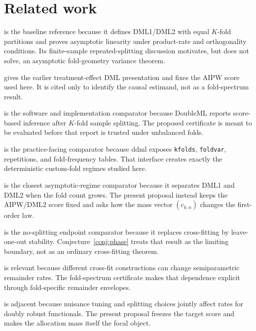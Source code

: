 \documentclass[11pt]{article}
\theoremstyle{definition}
\theoremstyle{plain}
\theoremstyle{remark}
\begin{document}
\section{Related work}
\citet[Sections~3.1 and~3.4]{ChernozhukovEtAl2018DML} is the baseline reference because it defines DML1/DML2 with equal \(K\)-fold partitions and proves asymptotic linearity under product-rate and orthogonality conditions. Its finite-sample repeated-splitting discussion motivates, but does not solve, an asymptotic fold-geometry variance theorem.

\citet{ChernozhukovEtAl2017DMLAPP} gives the earlier treatment-effect DML presentation and fixes the AIPW score used here. It is cited only to identify the causal estimand, not as a fold-spectrum result.

\citet{BachEtAl2024DoubleMLR} is the software and implementation comparator because DoubleML reports score-based inference after \(K\)-fold sample splitting. The proposed certificate is meant to be evaluated before that report is trusted under unbalanced folds.

\citet[Sections~5.2.1--5.2.3]{AhrensHansenSchafferWiemann2024DDML} is the practice-facing comparator because ddml exposes \texttt{kfolds}, \texttt{foldvar}, repetitions, and fold-frequency tables. That interface creates exactly the deterministic custom-fold regimes studied here.

\citet[abstract]{Velez2024DMLGrowingK} is the closest asymptotic-regime comparator because it separates DML1 and DML2 when the fold count grows. The present proposal instead keeps the AIPW/DML2 score fixed and asks how the mass vector \((c_{k,n})\) changes the first-order law.

\citet[abstract]{ChenSyrgkanisAustern2022NoSplitDML} is the no-splitting endpoint comparator because it replaces cross-fitting by leave-one-out stability. Conjecture~\ref{conj:phase} treats that result as the limiting boundary, not as an ordinary cross-fitting theorem.

\citet{NeweyRobins2018CrossFittingFastRemainders} is relevant because different cross-fit constructions can change semiparametric remainder rates. The fold-spectrum certificate makes that dependence explicit through fold-specific remainder envelopes.

\citet{McGrathMukherjee2022NuisanceTuningSplitting} is adjacent because nuisance tuning and splitting choices jointly affect rates for doubly robust functionals. The present proposal freezes the target score and makes the allocation mass itself the focal object.
\end{document}
